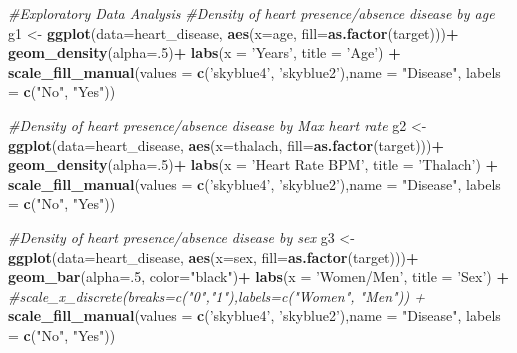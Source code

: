 \documentclass[]{article}
\newenvironment{Shaded}{\begin{snugshade}}{\end{snugshade}}
\newcommand{\KeywordTok}[1]{\textcolor[rgb]{0.13,0.29,0.53}{\textbf{#1}}}
\newcommand{\DataTypeTok}[1]{\textcolor[rgb]{0.13,0.29,0.53}{#1}}
\newcommand{\DecValTok}[1]{\textcolor[rgb]{0.00,0.00,0.81}{#1}}
\newcommand{\StringTok}[1]{\textcolor[rgb]{0.31,0.60,0.02}{#1}}
\newcommand{\CommentTok}[1]{\textcolor[rgb]{0.56,0.35,0.01}{\textit{#1}}}
\newcommand{\OperatorTok}[1]{\textcolor[rgb]{0.81,0.36,0.00}{\textbf{#1}}}
\newcommand{\NormalTok}[1]{#1}
\begin{document}
\begin{Shaded}
\begin{Highlighting}[]
\CommentTok{#Exploratory Data Analysis}
\CommentTok{#Density of heart presence/absence disease by age}
\NormalTok{g1 <-}\StringTok{ }\KeywordTok{ggplot}\NormalTok{(}\DataTypeTok{data=}\NormalTok{heart_disease, }\KeywordTok{aes}\NormalTok{(}\DataTypeTok{x=}\NormalTok{age, }\DataTypeTok{fill=}\KeywordTok{as.factor}\NormalTok{(target)))}\OperatorTok{+}
\StringTok{  }\KeywordTok{geom_density}\NormalTok{(}\DataTypeTok{alpha=}\NormalTok{.}\DecValTok{5}\NormalTok{)}\OperatorTok{+}
\StringTok{  }\KeywordTok{labs}\NormalTok{(}\DataTypeTok{x =} \StringTok{'Years'}\NormalTok{, }\DataTypeTok{title =} \StringTok{'Age'}\NormalTok{) }\OperatorTok{+}
\StringTok{  }\KeywordTok{scale_fill_manual}\NormalTok{(}\DataTypeTok{values =} \KeywordTok{c}\NormalTok{(}\StringTok{'skyblue4'}\NormalTok{, }\StringTok{'skyblue2'}\NormalTok{),}\DataTypeTok{name =} \StringTok{"Disease"}\NormalTok{, }\DataTypeTok{labels =} \KeywordTok{c}\NormalTok{(}\StringTok{"No"}\NormalTok{, }\StringTok{"Yes"}\NormalTok{))}

\CommentTok{#Density of heart presence/absence disease by Max heart rate}
\NormalTok{g2 <-}\StringTok{ }\KeywordTok{ggplot}\NormalTok{(}\DataTypeTok{data=}\NormalTok{heart_disease, }\KeywordTok{aes}\NormalTok{(}\DataTypeTok{x=}\NormalTok{thalach, }\DataTypeTok{fill=}\KeywordTok{as.factor}\NormalTok{(target)))}\OperatorTok{+}
\StringTok{  }\KeywordTok{geom_density}\NormalTok{(}\DataTypeTok{alpha=}\NormalTok{.}\DecValTok{5}\NormalTok{)}\OperatorTok{+}
\StringTok{  }\KeywordTok{labs}\NormalTok{(}\DataTypeTok{x =} \StringTok{'Heart Rate BPM'}\NormalTok{, }\DataTypeTok{title =} \StringTok{'Thalach'}\NormalTok{) }\OperatorTok{+}
\StringTok{  }\KeywordTok{scale_fill_manual}\NormalTok{(}\DataTypeTok{values =} \KeywordTok{c}\NormalTok{(}\StringTok{'skyblue4'}\NormalTok{, }\StringTok{'skyblue2'}\NormalTok{),}\DataTypeTok{name =} \StringTok{"Disease"}\NormalTok{, }\DataTypeTok{labels =} \KeywordTok{c}\NormalTok{(}\StringTok{"No"}\NormalTok{, }\StringTok{"Yes"}\NormalTok{))}

\CommentTok{#Density of heart presence/absence disease by sex}
\NormalTok{g3 <-}\StringTok{ }\KeywordTok{ggplot}\NormalTok{(}\DataTypeTok{data=}\NormalTok{heart_disease, }\KeywordTok{aes}\NormalTok{(}\DataTypeTok{x=}\NormalTok{sex, }\DataTypeTok{fill=}\KeywordTok{as.factor}\NormalTok{(target)))}\OperatorTok{+}
\StringTok{      }\KeywordTok{geom_bar}\NormalTok{(}\DataTypeTok{alpha=}\NormalTok{.}\DecValTok{5}\NormalTok{, }\DataTypeTok{color=}\StringTok{"black"}\NormalTok{)}\OperatorTok{+}
\StringTok{      }\KeywordTok{labs}\NormalTok{(}\DataTypeTok{x =} \StringTok{'Women/Men'}\NormalTok{, }\DataTypeTok{title =} \StringTok{'Sex'}\NormalTok{) }\OperatorTok{+}
\StringTok{      }\CommentTok{#scale_x_discrete(breaks=c("0","1"),labels=c("Women", "Men")) +}
\StringTok{      }\KeywordTok{scale_fill_manual}\NormalTok{(}\DataTypeTok{values =} \KeywordTok{c}\NormalTok{(}\StringTok{'skyblue4'}\NormalTok{, }\StringTok{'skyblue2'}\NormalTok{),}\DataTypeTok{name =} \StringTok{"Disease"}\NormalTok{, }\DataTypeTok{labels =} \KeywordTok{c}\NormalTok{(}\StringTok{"No"}\NormalTok{, }\StringTok{"Yes"}\NormalTok{))}


\end{Highlighting}
\end{Shaded}
\end{document}

